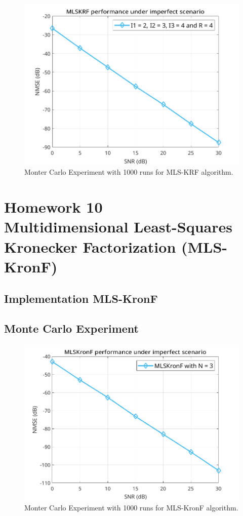 \documentclass[a4paper,10pt]{article}
\begin{document}
    \begin{figure}[ht!]
        \centering 
        \includegraphics[width=0.75\linewidth]{figs/hw9.png} \par 
        \caption{Monter Carlo Experiment with 1000 runs for MLS-KRF algorithm.}
        \label{fig:hw9} 
    \end{figure}

\newpage
\section*{Homework 10 \\ Multidimensional Least-Squares Kronecker Factorization
(MLS-KronF)}

    \subsection*{Implementation MLS-KronF}

    \subsection*{Monte Carlo Experiment}

    \begin{figure}[ht!]
        \centering 
        \includegraphics[width=0.75\linewidth]{figs/hw10.png} \par 
        \caption{Monter Carlo Experiment with 1000 runs for MLS-KronF algorithm.}
        \label{fig:hw10} 
    \end{figure}
\end{document}
